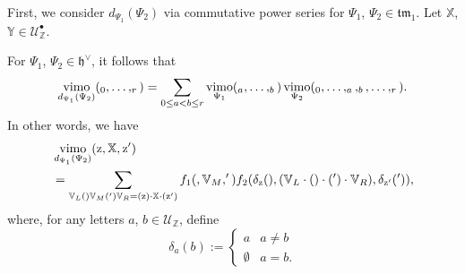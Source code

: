 \documentclass[15pt,oneside,reqno]{amsart}
\theoremstyle{remark}{
\newtheorem{lem}[df]{Lemma}
\newtheorem{prop}[df]{Proposition}
\newtheorem{ex}[df]{Example}
\newtheorem{rmk}[df]{Remark}
}
\newcommand{\ide}[1]{\mathfrak{#1}}
\newcommand{\Z}{\mathbb{Z}}
\newcommand{\tm}{\mathfrak{tm}}
\DeclareMathOperator{\vimo}{vimo}
\let\x\relax
\newcommand{\x}{\mathrm{x}}
\newcommand{\z}{\mathrm{z}}
\let\v\relax
\newcommand{\v}{\mathrm{v}}
\begin{document}
First, we consider $d_{\Psi_1}(\Psi_2)$ via commutative power series for $\Psi_1$, $\Psi_2 \in \tm_1$.
Let $\mathbb{X}$, $\mathbb{Y} \in \mathcal{U}_{\Z}^{\bullet}$.

\begin{prop}\label{prop:deriv-explicit}
For $\Psi_1$, $\Psi_2\in  \ide{h}^{\vee}$, it follows that
\[
\vimo_{d_{\Psi_1}(\Psi_2)}(\x_0,\ldots,\x_r) = \sum_{0\le a < b \le r} \vimo_{\Psi_1}(\x_a,\ldots,\x_b) \vimo_{\Psi_2}(\x_0,\ldots,\x_a,\x_b,\ldots,\x_r).
\]
In other words, we have
\begin{align}
\begin{aligned}
&\vimo_{d_{\Psi_1}(\Psi_2)}(\z,\mathbb{X},\z')\\
& =  \sum_{\mathbb{V}_L(\v)\mathbb{V}_M(\v')\mathbb{V}_R = (\z)\cdot \mathbb{X} \cdot (\z') } f_1(\v,\mathbb{V}_M,\v')f_2(\delta_{\z}(\v),(\mathbb{V}_L\cdot (\v)\cdot(\v') \cdot \mathbb{V}_R),\delta_{\z'}(\v')),
\end{aligned}  \label{eq:deriv-explicit}
\end{align}
where, for any letters $a$, $b \in \mathcal{U}_{\Z}$, define
\[
\delta_{a}(b):=
\begin{cases}
a & a \neq b\\
\emptyset & a = b.
\end{cases}
\]
\end{prop}
\end{document}
